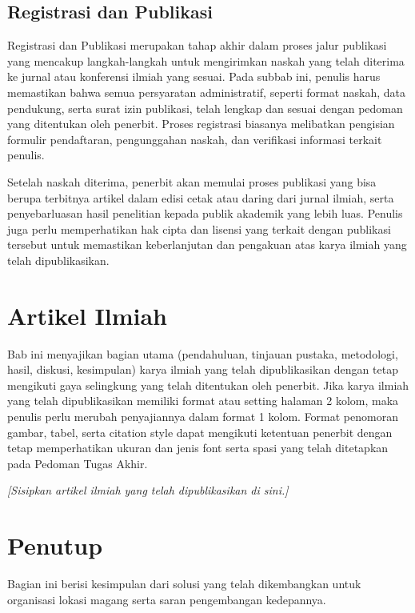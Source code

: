 \documentclass[a4paper,11pt,oneside]{report}
\begin{document}
\section{Registrasi dan Publikasi}
Registrasi dan Publikasi merupakan tahap akhir dalam proses jalur publikasi yang
mencakup langkah-langkah untuk mengirimkan naskah yang telah diterima ke jurnal
atau konferensi ilmiah yang sesuai. Pada subbab ini, penulis harus memastikan
bahwa semua persyaratan administratif, seperti format naskah, data pendukung,
serta surat izin publikasi, telah lengkap dan sesuai dengan pedoman yang
ditentukan oleh penerbit. Proses registrasi biasanya melibatkan pengisian
formulir pendaftaran, pengunggahan naskah, dan verifikasi informasi terkait
penulis.

Setelah naskah diterima, penerbit akan memulai proses publikasi yang bisa
berupa terbitnya artikel dalam edisi cetak atau daring dari jurnal ilmiah, serta
penyebarluasan hasil penelitian kepada publik akademik yang lebih luas. Penulis
\newpage
juga perlu memperhatikan hak cipta dan lisensi yang terkait dengan publikasi
tersebut untuk memastikan keberlanjutan dan pengakuan atas karya ilmiah yang
telah dipublikasikan.

\chapter{Artikel Ilmiah}
Bab ini menyajikan bagian utama (pendahuluan, tinjauan pustaka, metodologi,
hasil, diskusi, kesimpulan) karya ilmiah yang telah dipublikasikan dengan tetap
mengikuti gaya selingkung yang telah ditentukan oleh penerbit. Jika karya ilmiah
yang telah dipublikasikan memiliki format atau setting halaman 2 kolom, maka
penulis perlu merubah penyajiannya dalam format 1 kolom. Format penomoran
gambar, tabel, serta citation style dapat mengikuti ketentuan penerbit dengan
tetap memperhatikan ukuran dan jenis font serta spasi yang telah ditetapkan
pada Pedoman Tugas Akhir.

\textit{[Sisipkan artikel ilmiah yang telah dipublikasikan di sini.]}

\chapter{Penutup}
Bagian ini berisi kesimpulan dari solusi yang telah dikembangkan untuk
organisasi lokasi magang serta saran pengembangan kedepannya.
\end{document}
